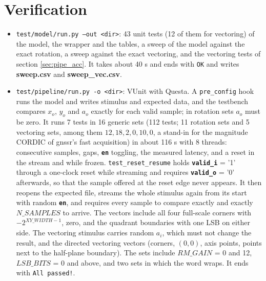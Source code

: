 \documentclass[a4paper, 12pt, notitlepage]{report}
\newcommand{\file}[1]{\textbf{#1}}
\newcommand{\signal}[1]{{\textbf{\tt#1}}}
\begin{document}
\section{Verification}
\begin{itemize}
   \item \texttt{test/model/run.py --out <dir>}: 43 unit tests (12 of them for vectoring) of the model, the wrapper and the
         tables, a sweep of the model against the exact rotation, a sweep against the exact vectoring, and the vectoring
         tests of section \ref{sec:pipe_acc}. It takes about 40 s and ends with \texttt{OK} and
         writes \file{sweep.csv} and \file{sweep\_vec.csv}.
   \item \texttt{test/pipeline/run.py -o <dir>}: VUnit with Questa. A \texttt{pre\_config} hook
         runs the model and writes stimulus and expected data, and the testbench compares
         $x_o$, $y_o$ and $a_o$ exactly for each valid sample; in rotation sets $a_o$ must be zero.
         It runs 7 tests in 16 generic sets (112 tests; 11 rotation sets and 5 vectoring sets, among them
         $12,18,2,0,10,0$, a stand-in for the magnitude CORDIC of gnssr's fast acquisition) in about 116 s with 8 threads: consecutive samples, gaps, \signal{en} toggling, the measured latency, and a
         reset in the stream and while frozen. \texttt{test\_reset\_resume} holds \signal{valid\_i} = '1'
         through a one-clock reset while streaming and requires \signal{valid\_o} = '0' afterwards, so that the
         sample offered at the reset edge never appears. It then reopens the expected file, streams the whole
         stimulus again from its start with random \signal{en}, and requires every sample to compare exactly and
         exactly $N\_SAMPLES$ to arrive. The vectors include all four full-scale corners with
         $-2^{XY\_WIDTH-1}$, zero, and the quadrant boundaries with one LSB on either side.
         The vectoring stimulus carries random $a_i$, which must not change the result, and the directed
         vectoring vectors (corners, $(0, 0)$, axis points, points next to the half-plane boundary).
         The sets include $RM\_GAIN$ = 0 and 12, $LSB\_BITS$ = 0 and above, and two sets in which the word
         wraps. It ends with \texttt{All passed!}.
\end{itemize}
\end{document}
